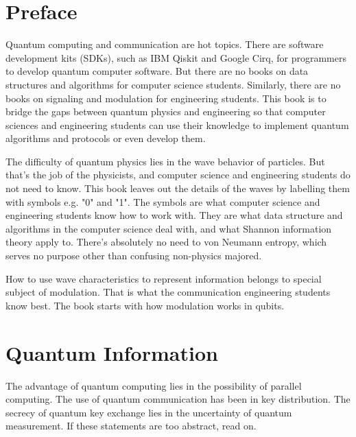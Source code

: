 \documentclass{book}
\begin{document}
\addtocounter{page}{2}

\chapter*{Preface}
Quantum computing and communication are hot topics. There are software development kits (SDKs), such as IBM Qiskit and Google Cirq, for programmers to develop quantum computer software. But there are no books on data structures and algorithms for computer science students. Similarly, there are no books on signaling and modulation for engineering students. This book is to bridge the gaps between quantum physics and engineering so that computer sciences and engineering students can use their knowledge to implement quantum algorithms and protocols or even develop them.

The difficulty of quantum physics lies in the wave behavior of particles. But that's the job of the physicists, and computer science and engineering students do not need to know. This book leaves out the details of the waves by labelling them with symbols e.g. "0" and "1". The symbols are what computer science and engineering students know how to work with. They are what data structure and algorithms in the computer science deal with, and what Shannon information theory apply to. There's absolutely no need to von Neumann entropy, which serves no purpose other than confusing non-physics majored.

How to use wave characteristics to represent information belongs to special subject of modulation. That is what  the communication engineering students know best. The book starts with how modulation works in qubits.

\setcounter{tocdepth}{3}
\tableofcontents

\mainmatter

\chapter{Quantum Information}
The advantage of quantum computing lies in the possibility of parallel computing. The use of quantum communication has been in key distribution. The secrecy of quantum key exchange lies in the uncertainty of quantum measurement. If these statements are too abstract, read on.
\end{document}
